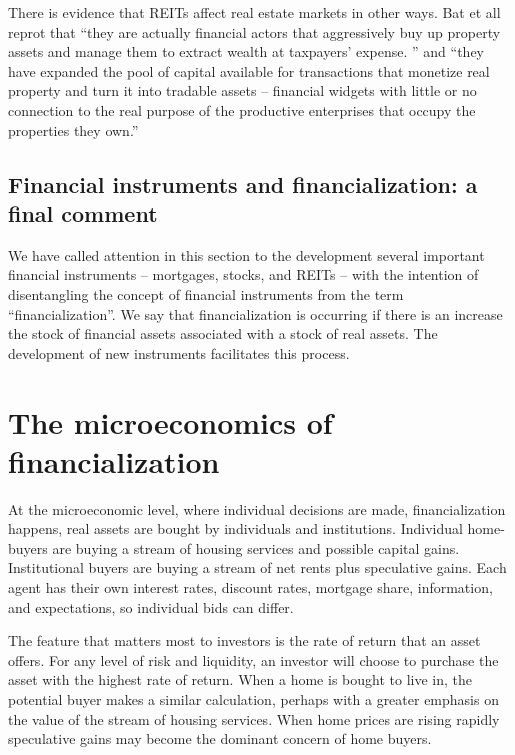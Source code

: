 There is evidence that REITs affect real estate markets in other ways. Bat et all  \cite{batRolePublicREITs2022} reprot that  ``they are actually financial actors that aggressively buy up property assets and manage them to extract wealth at taxpayers’ expense. '' and ``they have expanded the pool of capital available for transactions that monetize real property and turn it into tradable assets – financial widgets with little or no connection to the real purpose of the productive enterprises that occupy the properties they own.''





\subsection{Financial instruments and financialization: a final comment}
We have called attention in this section to the development  several important financial instruments -- mortgages, stocks, and REITs --  with the intention of  disentangling the concept of financial instruments from the term ``financialization''.  We say that financialization is occurring if there is an  increase the stock of financial assets associated with a stock of real assets. The development of new instruments facilitates this process. 

\section{The microeconomics of  financialization}\label{section-micro}

At  the microeconomic level, where individual decisions are made, financialization happens,  real assets are bought by individuals and institutions. Individual home-buyers are buying a stream of housing services and possible capital gains. Institutional buyers are buying a stream of net rents plus speculative gains. Each agent has their own interest rates, discount rates, mortgage share, information, and expectations, so individual bids can differ.




The feature that matters most to investors is the  \gls{rate of return} that  an asset offers. For any level of risk and liquidity, an investor will choose to purchase the asset with the highest rate of return. When a home is bought to live in, the potential buyer makes a similar calculation, perhaps with a greater emphasis on the value of the stream of housing services. When home prices are rising rapidly speculative gains may become the dominant concern of home buyers. 

